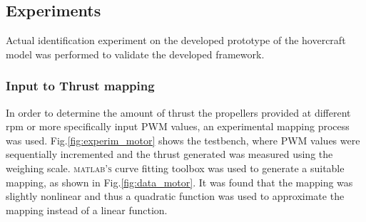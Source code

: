 \documentclass[12pt,titlepage]{article}
\begin{document}
\subsection{Experiments}
Actual identification experiment on the developed prototype of the hovercraft model was performed to validate the developed framework.

\subsubsection{Input to Thrust mapping}
In order to determine the amount of thrust the propellers provided at different rpm or more specifically input PWM values, an experimental mapping process was used. Fig.\ref{fig:experim_motor} shows the testbench, where PWM values were sequentially incremented and the thrust generated was measured using the weighing scale. \textsc{matlab's} curve fitting toolbox was used to generate a suitable mapping, as shown in Fig.\ref{fig:data_motor}. It was found that the mapping was slightly nonlinear and thus a  quadratic function was used to approximate the mapping instead of a linear function. 
\end{document}
